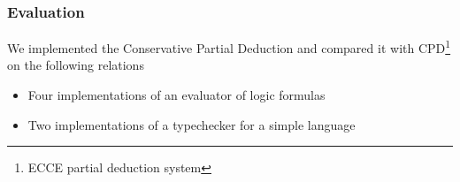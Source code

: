 \documentclass[xcolor=table]{beamer}
\begin{document}
\begin{frame}[fragile]
  \frametitle{Evaluation}
We implemented the Conservative Partial Deduction and compared it with CPD\footnote{ECCE partial deduction system} on the following relations

\begin{itemize}
  \item Four implementations of an evaluator of logic formulas
  \item Two implementations of a typechecker for a simple language
\end{itemize}
\end{frame}

%          
\end{document}

